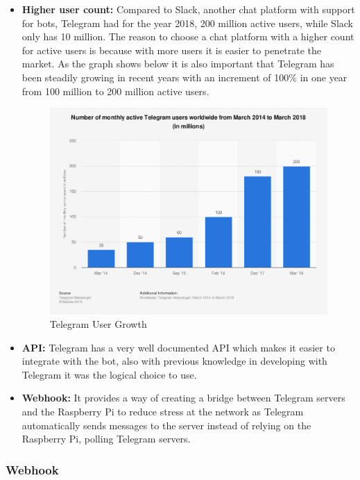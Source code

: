 \begin{itemize}
	\item{\textbf{Higher user count:} Compared to Slack, another chat platform with support for bots, Telegram had for the year 2018, 200 million active users, while Slack only has 10 million. The reason to choose a chat platform with a higher count for active users is because with more users it is easier to penetrate the market. As the graph shows below it is also important that Telegram has been steadily growing in recent years with an increment of 100\% in one year from 100 million to 200 million active users.
	\begin{center}
		\begin{figure}[h!]
			\centering
			\includegraphics[scale=0.4]{./images/4-tele}
			\caption{Telegram User Growth}
			\label{4_tele}
		\end{figure}
	\end{center}
	}
	\item{\textbf{API:} Telegram has a very well documented API which makes it easier to integrate with the bot, also with previous knowledge in developing with Telegram it was the logical choice to use.}
	\item{\textbf{Webhook:} It provides a way of creating a bridge between Telegram servers and the Raspberry Pi to reduce stress at the network as Telegram automatically sends messages to the server instead of relying on the Raspberry Pi, polling Telegram servers.}
\end{itemize} 

\subsubsection{Webhook}\label{sec:chap4_ori_webhook}

